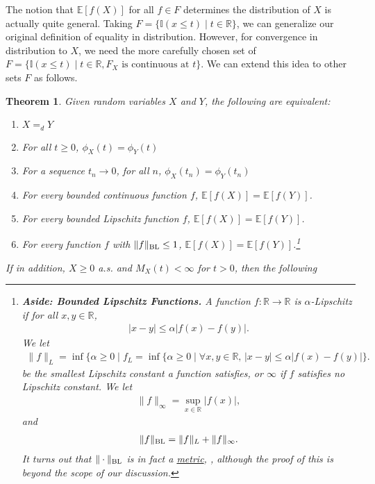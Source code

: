 \documentclass{article}
\newtheorem{theorem}{Theorem}
\theoremstyle{definition}
\newcommand{\E}{\mathbb E}
\newcommand{\1}{\mathbb I}
\newcommand{\R}{\mathbb R}
\newcommand{\BL}{\mathop{\text{\rm BL}}}
\begin{document}
The notion that $\E[f(X)]$ for all $f \in F$ determines the
distribution of $X$ is actually quite general.  Taking $F =\{\1(x \leq
t) \mid t \in \R\}$, we can generalize our original definition of
equality in distribution.  However, for convergence in distribution to
$X$, we need the more carefully chosen set of $F =\{\1(x \leq t) \mid
t \in \R, F_X \text{ is continuous at } t\}$.  We can extend this idea
to other sets $F$ as follows.

\begin{theorem}
  \label{thm:equality}
  Given random variables $X$ and $Y$, the following are equivalent:
  \begin{enumerate}
  \item [a.] $X =_d Y$
  \item [b.] For all $t \geq 0$, $\phi_X(t) = \phi_Y(t)$
  \item [c.] For a sequence $t_n \to 0$, for all $n$, $\phi_X(t_n) = \phi_Y(t_n)$
  \item [d.] For every bounded continuous function $f$, $\E[f(X)] = \E[f(Y)]$.
  \item [e.] For every bounded Lipschitz function $f$, $\E[f(X)] = \E[f(Y)]$.
  \item [f.] For every function $f$ with $\|f\|_{\BL} \leq 1$, $\E[f(X)] = \E[f(Y)]$.\footnote{
  {\bf Aside: Bounded Lipschitz Functions.} A function $f \colon \R \to \R$ is $\alpha$-Lipschitz if for all $x, y \in \R$,
\begin{align*}
  |x - y| \leq \alpha |f(x) - f(y)|.
\end{align*}
We let
\begin{align*}
  \|f\|_L = \inf\{\alpha \geq 0 \mid f_L = \inf\{\alpha \geq 0 \mid
  \forall x,y \in \R,\, |x - y| \leq \alpha |f(x) - f(y)|\}.
\end{align*}
be the smallest Lipschitz constant a function satisfies, or $\infty$
if $f$ satisfies no Lipschitz constant.  We let
\begin{align*}
  \|f\|_\infty = \sup_{x \in \R} |f(x)|,
\end{align*}
and
\begin{align*}
  \|f\|_{\BL} = \|f\|_L + \|f\|_\infty.
\end{align*}
It turns out that $\|\cdot\|_{\BL}$ is in fact a
\href{http://en.wikipedia.org/wiki/Metric_(mathematics)}{metric}, \cite{dudley2002real}, although the proof of this is
beyond the scope of our discussion.
}
  \end{enumerate}
  If in addition, $X \geq 0$ a.s. and $M_X(t) < \infty$ for $t > 0$, then the following

\end{theorem}
\end{document}
